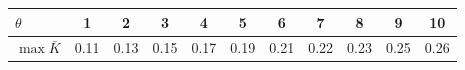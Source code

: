     \begin{tabular}{l|c|c|c|c|c|c|c|c|c|c} 
    \hline \hline 
       $\theta$ &  1 & 2 & 3 & 4 & 5 & 6 & 7 & 8 & 9 & 10 \\
      \hline \hline
     $\max\bar K$ & 0.11 & 0.13 & 0.15 & 0.17 & 0.19 & 0.21 & 0.22 & 0.23 & 0.25 & 0.26\\
     \hline
    \end{tabular}